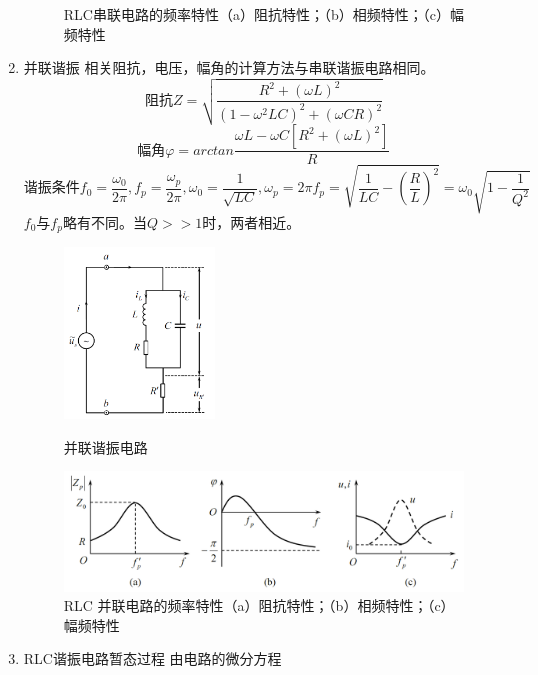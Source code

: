 \documentclass[UTF8]{article}
\begin{document}
\begin{enumerate}
\begin{figure}[H]
\begin{minipage}[t]{0.69\linewidth}
            \caption{RLC串联电路的频率特性（a）阻抗特性；（b）相频特性；（c）幅频特性}
        \end{minipage}
    \end{figure}
    \item 并联谐振 \newline \hspace*{2em}
    相关阻抗，电压，幅角的计算方法与串联谐振电路相同。
    \[\text{阻抗}Z=\sqrt{\frac{R^2+\left(\omega L\right)^2}{\left(1-\omega^2LC\right)^2+\left(\omega CR\right)^2}}\]
    \[\text{幅角}\varphi=arctan\frac{\omega L-\omega C\left[R^2+\left(\omega L\right)^2\right]}{R}\]
    \[\text{谐振条件}f_0=\frac{\omega_0}{2\pi},f_p=\frac{\omega_p}{2\pi},\omega_0=\frac{1}{\sqrt{LC}},\omega_p=2\pi f_p=\sqrt{\frac{1}{LC}-\left(\frac{R}{L}\right)^2}=\omega_0\sqrt{1-\frac{1}{Q^2}}\]
    \hspace*{2em} $f_0$与$f_p$略有不同。当$Q>>1$时，两者相近。
    \begin{figure}[H]
        \begin{minipage}[t]{0.3\linewidth}
            \centering
            \includegraphics[width=4cm]{Fig/4.png}
            \caption{并联谐振电路}
        \end{minipage}
        \begin{minipage}[t]{0.69\linewidth}
            \centering
            \includegraphics[width=11.5cm]{Fig/5.png}
            \caption{RLC 并联电路的频率特性（a）阻抗特性；（b）相频特性；（c）幅频特性}
        \end{minipage}
    \end{figure}
    \item RLC谐振电路暂态过程
    \newline \hspace*{2em}由电路的微分方程

\end{enumerate}
\end{document}
